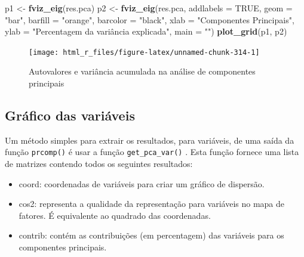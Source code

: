 \documentclass[
]{book}
\newenvironment{Shaded}{\begin{snugshade}}{\end{snugshade}}
\newcommand{\DataTypeTok}[1]{\textcolor[rgb]{0.13,0.29,0.53}{#1}}
\newcommand{\KeywordTok}[1]{\textcolor[rgb]{0.13,0.29,0.53}{\textbf{#1}}}
\newcommand{\NormalTok}[1]{#1}
\newcommand{\OtherTok}[1]{\textcolor[rgb]{0.56,0.35,0.01}{#1}}
\newcommand{\StringTok}[1]{\textcolor[rgb]{0.31,0.60,0.02}{#1}}
\providecommand{\tightlist}{%
  \setlength{\itemsep}{0pt}\setlength{\parskip}{0pt}}
\begin{document}
\begin{Shaded}
\begin{Highlighting}[]
\NormalTok{p1 <-}\StringTok{ }\KeywordTok{fviz_eig}\NormalTok{(res.pca)}
\NormalTok{p2 <-}\StringTok{ }\KeywordTok{fviz_eig}\NormalTok{(res.pca,}
               \DataTypeTok{addlabels =} \OtherTok{TRUE}\NormalTok{,}
               \DataTypeTok{geom =} \StringTok{"bar"}\NormalTok{,}
               \DataTypeTok{barfill =} \StringTok{"orange"}\NormalTok{,}
               \DataTypeTok{barcolor =} \StringTok{"black"}\NormalTok{,}
               \DataTypeTok{xlab =} \StringTok{"Componentes Principais"}\NormalTok{,}
               \DataTypeTok{ylab =} \StringTok{"Percentagem da variância explicada"}\NormalTok{,}
               \DataTypeTok{main =} \StringTok{""}\NormalTok{)}
\KeywordTok{plot_grid}\NormalTok{(p1, p2)}
\end{Highlighting}
\end{Shaded}

\begin{figure}

{\centering \texttt{[image: html\_r\_files/figure-latex/unnamed-chunk-314-1]} 

}

\caption{Autovalores e variância acumulada na análise de componentes principais}\label{fig:unnamed-chunk-314}
\end{figure}

\hypertarget{gruxe1fico-das-variuxe1veis}{%
\subsection{Gráfico das variáveis}\label{gruxe1fico-das-variuxe1veis}}

Um método simples para extrair os resultados, para variáveis, de uma saída da função \texttt{prcomp()}  é usar a função \texttt{get\_pca\_var()} . Esta função fornece uma lista de matrizes contendo todos os seguintes resultados:

\begin{itemize}
\tightlist
\item
  coord: coordenadas de variáveis para criar um gráfico de dispersão.
\item
  cos2: representa a qualidade da representação para variáveis no mapa de fatores. É equivalente ao quadrado das coordenadas.
\item
  contrib: contém as contribuições (em percentagem) das variáveis para os componentes principais.
\end{itemize}
\end{document}
